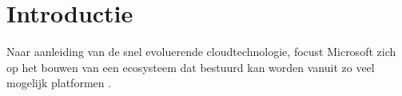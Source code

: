 
\section{Introductie}%
\label{sec:introductie}

\begin{comment}
Waarover zal je bachelorproef gaan? Introduceer het thema en zorg dat volgende zaken zeker duidelijk aanwezig zijn:

\begin{itemize}
  \item kaderen thema
  \item de doelgroep
  \item de probleemstelling en (centrale) onderzoeksvraag
  \item de onderzoeksdoelstelling
\end{itemize}

Denk er aan: een typische bachelorproef is \textit{toegepast onderzoek}, wat betekent dat je start vanuit een concrete probleemsituatie in bedrijfscontext, een \textbf{casus}. Het is belangrijk om je onderwerp goed af te bakenen: je gaat voor die \textit{ene specifieke probleemsituatie} op zoek naar een goede oplossing, op basis van de huidige kennis in het vakgebied.

De doelgroep moet ook concreet en duidelijk zijn, dus geen algemene of vaag gedefinieerde groepen zoals \emph{bedrijven}, \emph{developers}, \emph{Vlamingen}, enz. Je richt je in elk geval op it-professionals, een bachelorproef is geen populariserende tekst. Eén specifiek bedrijf (die te maken hebben met een concrete probleemsituatie) is dus beter dan \emph{bedrijven} in het algemeen.

Formuleer duidelijk de onderzoeksvraag! De begeleiders lezen nog steeds te veel voorstellen waarin we geen onderzoeksvraag terugvinden.

Schrijf ook iets over de doelstelling. Wat zie je als het concrete eindresultaat van je onderzoek, naast de uitgeschreven scriptie? Is het een proof-of-concept, een rapport met aanbevelingen, \ldots Met welk eindresultaat kan je je bachelorproef als een succes beschouwen?

\end{comment}

Naar aanleiding van de snel evoluerende cloudtechnologie, focust Microsoft zich op het bouwen van een ecosysteem dat bestuurd kan worden vanuit zo veel mogelijk platformen \autocite{Parker2021}. \\

